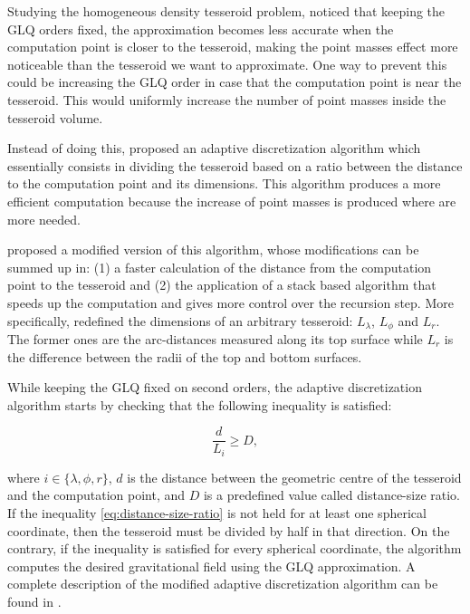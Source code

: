 \documentclass[extra]{gji}
\begin{document}
Studying the homogeneous density tesseroid problem, \citet{Ku1977} 
noticed that keeping the GLQ orders fixed, the approximation 
becomes less accurate when the computation point is closer to the 
tesseroid, making the point masses effect more noticeable than the 
tesseroid we want to approximate.
One way to prevent this could be increasing the GLQ order in case that 
the computation point is near the tesseroid.
This would uniformly increase the number of point masses inside the 
tesseroid volume.

Instead of doing this, \citet{Li2011} proposed an adaptive 
discretization algorithm which essentially consists in dividing the 
tesseroid based on a ratio between the distance to the computation 
point and its dimensions.
This algorithm produces a more efficient computation because the 
increase of point masses is produced where are more needed.

\citet{Uieda2016} proposed a modified version of this algorithm, whose
modifications can be summed up in:
(1) a faster calculation of the distance from the computation point to 
the tesseroid and 
(2) the application of a stack based algorithm that speeds up the 
computation and gives more control over the recursion step.
More specifically, \citet{Uieda2016} redefined the dimensions of an 
arbitrary tesseroid: $L_\lambda$, $L_\phi$ and $L_r$. The former ones 
are the arc-distances measured along its top surface while $L_r$ is the 
difference between the radii of the top and bottom surfaces.

While keeping the GLQ fixed on second orders, the adaptive 
discretization algorithm starts by checking that the following 
inequality is satisfied:

\begin{equation}
    \frac{d}{L_i} \geq D,
\label{eq:distance-size-ratio}
\end{equation}

\noindent where $i \in \{\lambda, \phi, r\}$, $d$ is the distance 
between the geometric centre of the tesseroid and the computation 
point, and $D$ is a predefined value called distance-size ratio.
If the inequality \ref{eq:distance-size-ratio} is not held for at least 
one spherical coordinate, then the tesseroid must be divided by half in 
that direction.
On the contrary, if the inequality is satisfied for every spherical 
coordinate, the algorithm computes the desired gravitational field using the 
GLQ approximation.
A complete description of the modified adaptive discretization 
algorithm can be found in \citet{Uieda2016}.
\end{document}
